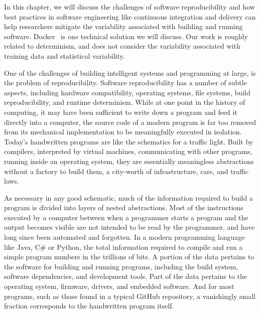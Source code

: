 \documentclass[12pt,initial,twoside,maitrise]{dms}
\numberwithin{equation}{section}
\numberwithin{table}{chapter}
\numberwithin{figure}{chapter}
\begin{document}
In this chapter, we will discuss the challenges of software reproducibility and how best practices in software engineering like continuous integration and delivery can help researchers mitigate the variability associated with building and running software. Docker~\cite{merkel2014docker} is one technical solution we will discuss. Our work is roughly related to determinism, and does not consider the variability associated with training data and statistical variability.

One of the challenges of building intelligent systems and programming at large, is the problem of reproducibility. Software reproducibility has a number of subtle aspects, including hardware compatibility, operating systems, file systems, build reproducibility, and runtime determinism. While at one point in the history of computing, it may have been sufficient to write down a program and feed it directly into a computer, the source code of a modern program is far too removed from its mechanical implementation to be meaningfully executed in isolation. Today's handwritten programs are like the schematics for a traffic light. Built by compilers, interpreted by virtual machines, communicating with other programs, running inside an operating system, they are essentially meaningless abstractions without a factory to build them, a city-worth of infrastructure, cars, and traffic laws.

As necessary in any good schematic, much of the information required to build a program is divided into layers of nested abstractions. Most of the instructions executed by a computer between when a programmer starts a program and the output becomes visible are not intended to be read by the programmer, and have long since been automated and forgotten. In a modern programming language like Java, C\# or Python, the total information required to compile and run a simple program numbers in the trillions of bits. A portion of the data pertains to the software for building and running programs, including the build system, software dependencies, and development tools. Part of the data pertains to the operating system, firmware, drivers, and embedded software. And for most programs, such as those found in a typical GitHub repository, a vanishingly small fraction corresponds to the handwritten program itself.
\end{document}
